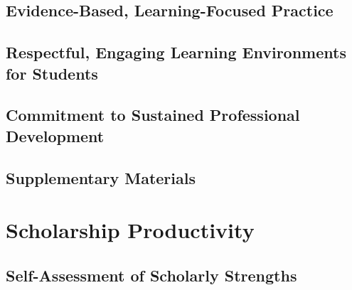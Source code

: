 \documentclass[11pt]{report}
\begin{document}
\chapter{Evidence-Based, Learning-Focused Practice}  %


\chapter{Respectful, Engaging Learning Environments for Students}  %


\chapter{Commitment to Sustained Professional Development}  %


\chapter{Supplementary Materials}  %

\begin{supplements}[
    directory=../../,
    type=\LaTeXe{} packages,
]
\end{supplements}


\part{Scholarship Productivity}\label{part:scholarship}

\chapter{Self-Assessment of Scholarly Strengths}


\end{document}
